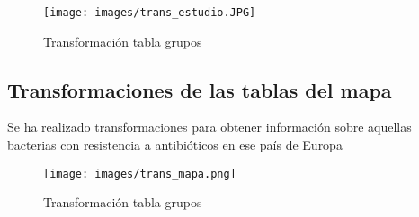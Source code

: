 \documentclass[../main.tex]{subfiles}
\begin{document}
\begin{figure}[h]
    \centering
    \texttt{[image: images/trans\_estudio.JPG]}
    \caption{Transformación tabla grupos}
    \label{transG}
\end{figure}


\subsection{Transformaciones de las tablas del mapa}

Se ha realizado transformaciones para obtener información sobre aquellas bacterias con resistencia a antibióticos en ese país de Europa

\hfill

\begin{figure}[h]
    \centering
    \texttt{[image: images/trans\_mapa.png]}
    \caption{Transformación tabla grupos}
    \label{transMapa}
\end{figure}
\end{document}
